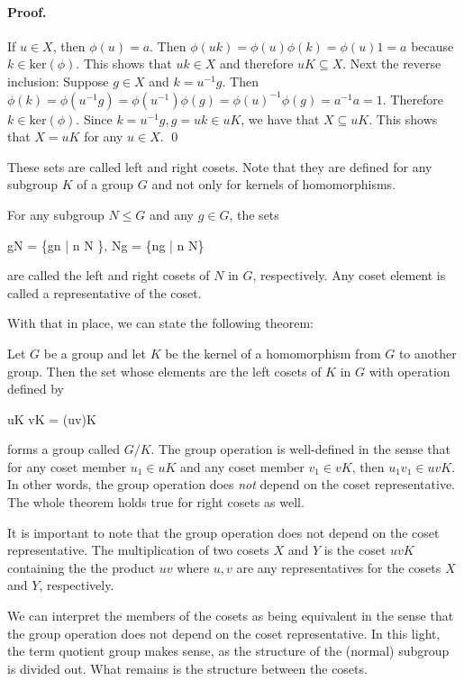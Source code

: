 \paragraph{Proof.} If $u \in X$, then $\phi(u) = a$. Then $\phi(uk) = \phi(u) \phi(k) = \phi(u) 1 = a$ because $k \in \text{ker}(\phi)$. This shows that $uk \in X$ and therefore $uK \subseteq X$. Next the reverse inclusion: Suppose $g \in X$ and $k = u^{-1}g$. Then $\phi(k) = \phi(u^{-1}g) = \phi(u^{-1}) \phi(g) = \phi(u)^{-1} \phi(g) = a^{-1}a = 1$. Therefore $k \in \text{ker}(\phi)$. Since $k=u^{-1}g, g = uk \in uK$, we have that $X \subseteq uK$. This shows that $X = uK$ for any $u \in X$. \qed

These sets are called left and right cosets. Note that they are defined for any subgroup $K$ of a group $G$ and not only for kernels of homomorphisms.

\begin{definition}[Cosets]
For any subgroup $N \leq G$ and any $g \in G$, the sets

\bee
gN = \{gn | n \in N \}, \quad Ng = \{ng | n  \in N\}
\eee

are called the left and right cosets of $N$ in $G$, respectively. Any coset element is called a representative of the coset.
\end{definition}

With that in place, we can state the following theorem: 

\begin{theorem}
Let $G$ be a group and let $K$ be the kernel of a homomorphism from $G$ to another group. Then the set whose elements are the left cosets of $K$ in $G$ with operation defined by

\bee
uK vK = (uv)K
\eee

forms a group called $G/K$. The group operation is well-defined in the sense that for any coset member $u_1 \in uK$ and any coset member $v_1 \in vK$, then $u_1 v_1 \in uvK$. In other words, the group operation does \emph{not} depend on the coset representative. The whole theorem holds true for right cosets as well.
\end{theorem}

It is important to note that the group operation does not depend on the coset representative. The multiplication of two cosets $X$ and $Y$ is the coset $uvK$ containing the the product $uv$ where $u,v$ are any representatives for the cosets $X$ and $Y$, respectively.

We can interpret the members of the cosets as being equivalent in the sense that the group operation does not depend on the coset representative. In this light, the term quotient group makes sense, as the structure of the (normal) subgroup is divided out. What remains is the structure between the cosets.

